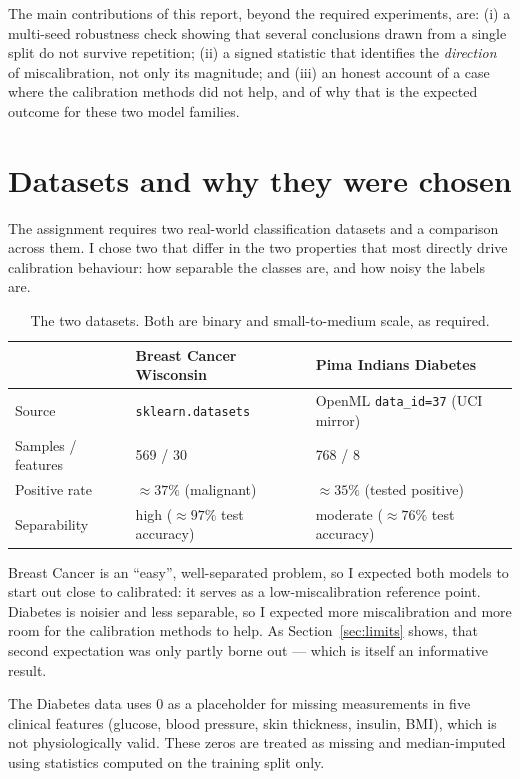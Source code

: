 \documentclass[11pt,a4paper]{article}
\begin{document}
The main contributions of this report, beyond the required experiments, are: (i) a multi-seed robustness
check showing that several conclusions drawn from a single split do not survive repetition; (ii) a signed
statistic that identifies the \emph{direction} of miscalibration, not only its magnitude; and (iii) an
honest account of a case where the calibration methods did not help, and of why that is the expected
outcome for these two model families.

\section{Datasets and why they were chosen}

The assignment requires two real-world classification datasets and a comparison across them. I chose two
that differ in the two properties that most directly drive calibration behaviour: how separable the
classes are, and how noisy the labels are.

\begin{table}[h]
\centering
\small
\begin{tabular}{lll}
\toprule
 & \textbf{Breast Cancer Wisconsin} & \textbf{Pima Indians Diabetes} \\
\midrule
Source & \texttt{sklearn.datasets} & OpenML \texttt{data\_id=37} (UCI mirror) \\
Samples / features & 569 / 30 & 768 / 8 \\
Positive rate & $\approx 37\%$ (malignant) & $\approx 35\%$ (tested positive) \\
Separability & high ($\approx 97\%$ test accuracy) & moderate ($\approx 76\%$ test accuracy) \\
\bottomrule
\end{tabular}
\caption{The two datasets. Both are binary and small-to-medium scale, as required.}
\end{table}

Breast Cancer is an ``easy'', well-separated problem, so I expected both models to start out close to
calibrated: it serves as a low-miscalibration reference point. Diabetes is noisier and less separable, so
I expected more miscalibration and more room for the calibration methods to help. As Section~\ref{sec:limits}
shows, that second expectation was only partly borne out --- which is itself an informative result.

The Diabetes data uses $0$ as a placeholder for missing measurements in five clinical features (glucose,
blood pressure, skin thickness, insulin, BMI), which is not physiologically valid. These zeros are treated
as missing and median-imputed using statistics computed on the training split only.
\end{document}
